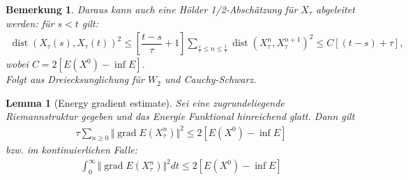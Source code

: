 \documentclass[11pt,a4paper,notitlepage]{scrreprt}
\newcommand{\dist}{\operatorname{dist}}
\newcommand{\grad}{\operatorname{grad}}
\newtheorem{lem}[defi]{Lemma}
\newtheorem{bem}[defi]{Bemerkung}
\begin{document}
\begin{bem}
Daraus kann auch eine Hölder 1/2-Abschätzung für $X_\tau$ abgeleitet werden: für $s<t$ gilt:
\begin{eqnarray}
\dist(X_\tau(s),X_\tau(t))^2 \leq \left[\dfrac{t-s}{\tau}+1\right] \sum_{\frac{s}{\tau}\leq n \leq \frac{t}{\tau}} \dist (X^n_\tau, X_\tau^{n+1})^2 \leq C[(t-s)+\tau], \label{Hölder}
\end{eqnarray}
wobei $C=2[E(X^0)-\inf E]$.
\\ 
Folgt aus Dreiecksunglichung für $W_2$ und Cauchy-Schwarz.
\end{bem}
 
\begin{lem}[Energy gradient estimate]
Sei eine zugrundeliegende Riemannstruktur gegeben und das Energie Funktional hinreichend glatt. Dann gilt 
\begin{eqnarray}
\tau \sum_{n\geq 0} \Vert\grad E(X_\tau^n)\Vert^2 \leq 2[E(X^0)-\inf E]
\end{eqnarray}
bzw. im kontinuierlichen Falle:
\begin{eqnarray}
\int_0^\infty \Vert\grad E(X_\tau^n)\Vert^2 dt\leq 2[E(X^0)-\inf E]
\label{Engrad}
\end{eqnarray}
\end{lem}
\end{document}
